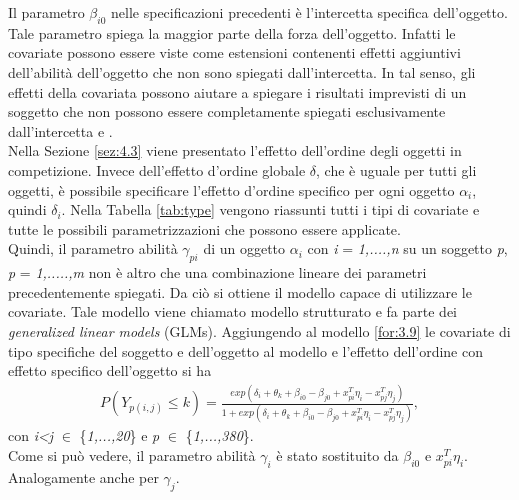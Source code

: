 Il parametro $\beta_{i0}$ nelle specificazioni precedenti è l'intercetta specifica dell'oggetto. Tale parametro spiega la maggior parte della forza dell'oggetto. Infatti le covariate possono essere viste come estensioni contenenti effetti aggiuntivi dell'abilità dell'oggetto che non sono spiegati dall'intercetta. In tal senso, gli effetti della covariata possono aiutare a spiegare i risultati imprevisti di un soggetto che non possono essere completamente spiegati esclusivamente dall'intercetta \autocite{cattelan2012models} e \autocite{schauberger2017}.\\
Nella Sezione \ref{sez:4.3} viene presentato l'effetto dell'ordine degli oggetti in competizione. Invece dell'effetto d'ordine globale $\delta$, che è uguale per tutti gli oggetti, è possibile specificare l'effetto d'ordine specifico per ogni oggetto $\alpha_i$, quindi $\delta_i$. Nella Tabella \ref{tab:type} vengono riassunti tutti i tipi di covariate e tutte le possibili parametrizzazioni che possono essere applicate.\\
Quindi, il parametro abilità $\gamma_{pi}$ di un oggetto $\alpha_i$ con \emph{i} = \emph{1,....,n} su un soggetto \emph{p}, \emph{p} = \emph{1,.....,m} non è altro che una combinazione lineare dei parametri precedentemente spiegati. Da ciò si ottiene il modello capace di utilizzare le covariate. Tale modello viene chiamato modello strutturato e fa parte dei \emph{generalized linear models} (GLMs). Aggiungendo al modello \ref{for:3.9} le covariate di tipo specifiche del soggetto e dell'oggetto al modello e l'effetto dell'ordine con effetto specifico dell'oggetto si ha
\begin{align}
	P(Y_{p(i,j)}\leq k) =  \frac{exp(\delta_i + \theta_{k} + \beta_{i0} - \beta_{j0} + x^T_{pi}\eta_i - x^T_{pj}\eta_j)}{1 + exp(\delta_i + \theta_{k} + \beta_{i0} - \beta_{j0} + x^T_{pi}\eta_i - x^T_{pj}\eta_j)}, \label{for:4.9}
\end{align}
con \emph{i<j} $\in$ \{\emph{1,...,20}\} e \emph{p} $\in$ \{\emph{1,...,380}\}.\\
Come si può vedere, il parametro abilità $\gamma_{i}$ è stato sostituito da $\beta_{i0}$ e $ x^T_{pi}\eta_i$. Analogamente anche per $\gamma_{j}$.
